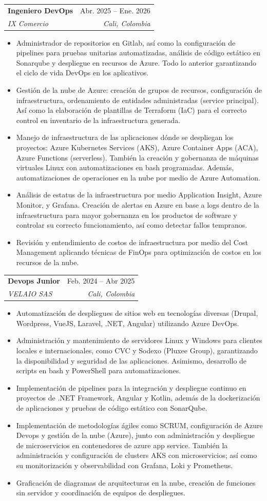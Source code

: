 \documentclass[letterpaper,11pt]{article}
\makeatletter
\newcommand{\resumeItem}[1]{
  \item\small{
    {#1 \vspace{-2pt}}
  }
}
\newcommand{\resumeSubheading}[4]{
  \vspace{-2pt}\item
    \begin{tabular*}{0.97\textwidth}[t]{l@{\extracolsep{\fill}}r}
      \textbf{#1} & #2 \\
      \textit{\small#3} & \textit{\small #4} \\
    \end{tabular*}\vspace{-7pt}
}
\newcommand{\resumeItemListStart}{\begin{itemize}}
\newcommand{\resumeItemListEnd}{\end{itemize}\vspace{-5pt}}
\makeatother
\begin{document}
    \resumeSubheading
    {Ingeniero DevOps}{Abr. 2025 -- Ene. 2026}
    {IX Comercio}{Cali, Colombia}
    \resumeItemListStart
      \resumeItem{Administrador de repositorios en Gitlab, así como la configuración de pipelines para pruebas unitarias automatizadas, análisis de código estático en Sonarqube y despliegue en recursos de Azure. Todo lo anterior garantizando el ciclo de vida DevOps en los aplicativos.}
      \resumeItem{Gestión de la nube de Azure: creación de grupos de recursos, configuración de infraestructura, ordenamiento de entidades administradas (service principal). Así como la elaboración de plantillas de Terraform (IaC) para el correcto control en inventario de la infraestructura generada.}
      \resumeItem{Manejo de infraestructura de las aplicaciones dónde se despliegan los proyectos: Azure Kubernetes Services (AKS), Azure Container Apps (ACA), Azure Functions (serverless). También la creación y gobernanza de máquinas virtuales Linux con automatizaciones en bash programadas. Además, automatizaciones de operaciones en la nube por medio de Azure Automation.}
      \resumeItem{Análisis de estatus de la infraestructura por medio Application Insight, Azure Monitor, y Grafana. Creación de alertas en Azure en base a logs dentro de la infraestructura para mayor gobernanza en los productos de software y controlar su correcto funcionamiento, así como detectar fallos tempranos.}
      \resumeItem{Revisión y entendimiento de costos de infraestructura por medio del Cost Management aplicando técnicas de FinOps para optimización de costos en los recursos de la nube. }
    \resumeItemListEnd

  \resumeSubheading
  {Devops Junior}{Feb. 2024 -- Abr 2025}
  {VELAIO SAS}{Cali, Colombia}
  \resumeItemListStart
    \resumeItem{Automatización de despliegues de sitios web en tecnologías diversas (Drupal, Wordpress, VueJS, Laravel, .NET, Angular) utilizando Azure DevOps.}
    \resumeItem{Administración y mantenimiento de servidores Linux y Windows para clientes locales e internacionales, como CVC y Sodexo (Pluxee Group), garantizando la disponibilidad y seguridad de las aplicaciones. Asimismo, desarrollo de scripts en bash y PowerShell para automatizaciones.}
    \resumeItem{Implementación de pipelines para la integración y despliegue continuo en proyectos de .NET Framework, Angular y Kotlin, además de la dockerización de aplicaciones y pruebas de código estático con SonarQube.}
    \resumeItem{Implementación de metodologías ágiles como SCRUM, configuración de Azure Devops y gestión de la nube (Azure), junto con administración y despliegue de microservicios en contenedores de azure app service. También la administración y configuración de clusters AKS con microservicios; así como su monitorización y observabilidad con Grafana, Loki y Prometheus.}
    \resumeItem{Graficación de diagramas de arquitecturas en la nube, creación de funciones sin servidor y coordinación de equipos de despliegues.}
  \resumeItemListEnd
\end{document}
